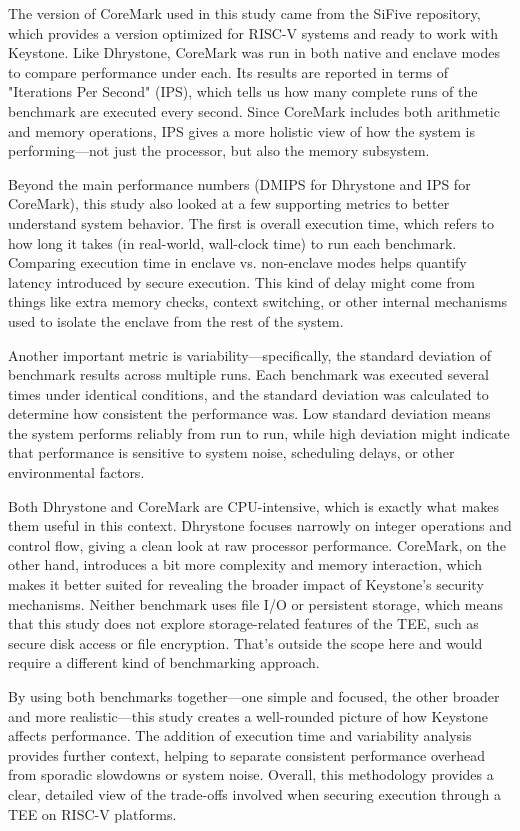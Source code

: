 The version of CoreMark used in this study came from the SiFive repository, which provides a version optimized for RISC-V systems and ready to work with Keystone. Like Dhrystone, CoreMark was run in both native and enclave modes to compare performance under each. Its results are reported in terms of "Iterations Per Second" (IPS), which tells us how many complete runs of the benchmark are executed every second. Since CoreMark includes both arithmetic and memory operations, IPS gives a more holistic view of how the system is performing—not just the processor, but also the memory subsystem.

Beyond the main performance numbers (DMIPS for Dhrystone and IPS for CoreMark), this study also looked at a few supporting metrics to better understand system behavior. The first is overall execution time, which refers to how long it takes (in real-world, wall-clock time) to run each benchmark. Comparing execution time in enclave vs. non-enclave modes helps quantify latency introduced by secure execution. This kind of delay might come from things like extra memory checks, context switching, or other internal mechanisms used to isolate the enclave from the rest of the system.

Another important metric is variability—specifically, the standard deviation of benchmark results across multiple runs. Each benchmark was executed several times under identical conditions, and the standard deviation was calculated to determine how consistent the performance was. Low standard deviation means the system performs reliably from run to run, while high deviation might indicate that performance is sensitive to system noise, scheduling delays, or other environmental factors.

Both Dhrystone and CoreMark are CPU-intensive, which is exactly what makes them useful in this context. Dhrystone focuses narrowly on integer operations and control flow, giving a clean look at raw processor performance. CoreMark, on the other hand, introduces a bit more complexity and memory interaction, which makes it better suited for revealing the broader impact of Keystone’s security mechanisms. Neither benchmark uses file I/O or persistent storage, which means that this study does not explore storage-related features of the TEE, such as secure disk access or file encryption. That’s outside the scope here and would require a different kind of benchmarking approach.

By using both benchmarks together—one simple and focused, the other broader and more realistic—this study creates a well-rounded picture of how Keystone affects performance. The addition of execution time and variability analysis provides further context, helping to separate consistent performance overhead from sporadic slowdowns or system noise. Overall, this methodology provides a clear, detailed view of the trade-offs involved when securing execution through a TEE on RISC-V platforms.

